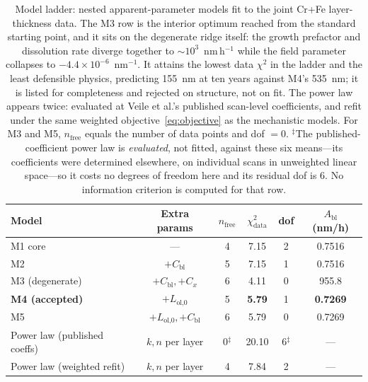 \documentclass[preprint,12pt]{elsarticle}
\begin{document}
\begin{table}[htbp]
\centering
\caption{Model ladder: nested apparent-parameter models fit to the
joint Cr+Fe layer-thickness data. The M3 row is the interior optimum
reached from the standard starting point, and it sits on the degenerate
ridge itself: the growth prefactor and dissolution rate diverge together
to $\sim\!10^{3}$~nm\,h$^{-1}$ while the field parameter collapses to
$-4.4\times10^{-6}$~nm$^{-1}$. It attains the lowest data $\chi^2$ in
the ladder and the least defensible physics, predicting 155~nm at ten
years against M4's 535~nm; it is listed for completeness and rejected on
structure, not on fit.
The power law appears twice: evaluated at Veile et al.'s published
scan-level coefficients, and refit under the same weighted
objective~\eqref{eq:objective} as the mechanistic models. For M3 and
M5, $n_\text{free}$ equals the number of data points and dof $=0$.
$^\ddagger$The published-coefficient power law is \emph{evaluated}, not
fitted, against these six means---its coefficients were determined
elsewhere, on individual scans in unweighted linear space---so it costs
no degrees of freedom here and its residual dof is 6. No information
criterion is computed for that row.}
\label{tab:ladder}
\footnotesize
\begin{tabular}{lccccc}
\toprule
Model & Extra params & $n_\text{free}$ & $\chi^2_\text{data}$ & dof & $A_\text{bl}$ (nm/h) \\
\midrule
M1 core & --- & 4 & 7.15 & 2 & 0.7516 \\
M2 & $+C_\text{bl}$ & 5 & 7.15 & 1 & 0.7516 \\
M3 (degenerate) & $+C_\text{bl}, +C_x$ & 6 & 4.11 & 0 & 955.8 \\
\textbf{M4 (accepted)} & $+L_\text{ol,0}$ & 5 & \textbf{5.79} & 1 & \textbf{0.7269} \\
M5 & $+L_\text{ol,0}, +C_\text{bl}$ & 6 & 5.79 & 0 & 0.7269 \\
Power law (published coeffs) & $k,n$ per layer & 0$^\ddagger$ & 20.10 & 6$^\ddagger$ & --- \\
Power law (weighted refit) & $k,n$ per layer & 4 & 7.84 & 2 & --- \\
\bottomrule
\end{tabular}
\end{table}
\end{document}

